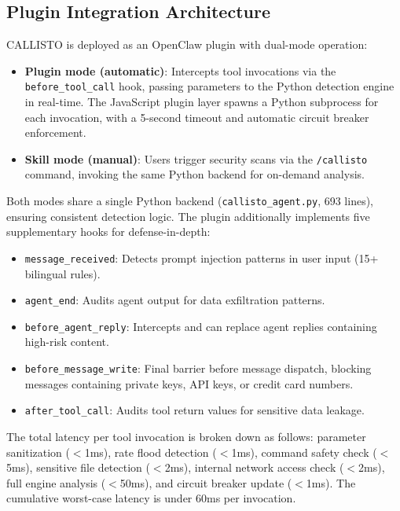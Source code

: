 \documentclass[10pt,conference]{IEEEtran}
\begin{document}
\subsection{Plugin Integration Architecture}

CALLISTO is deployed as an OpenClaw plugin with dual-mode operation:

\begin{itemize}
    \item \textbf{Plugin mode (automatic)}: Intercepts tool invocations via the \texttt{before\_tool\_call} hook, passing parameters to the Python detection engine in real-time. The JavaScript plugin layer spawns a Python subprocess for each invocation, with a 5-second timeout and automatic circuit breaker enforcement.
    \item \textbf{Skill mode (manual)}: Users trigger security scans via the \texttt{/callisto} command, invoking the same Python backend for on-demand analysis.
\end{itemize}

Both modes share a single Python backend (\texttt{callisto\_agent.py}, 693 lines), ensuring consistent detection logic. The plugin additionally implements five supplementary hooks for defense-in-depth:

\begin{itemize}
    \item \texttt{message\_received}: Detects prompt injection patterns in user input (15+ bilingual rules).
    \item \texttt{agent\_end}: Audits agent output for data exfiltration patterns.
    \item \texttt{before\_agent\_reply}: Intercepts and can replace agent replies containing high-risk content.
    \item \texttt{before\_message\_write}: Final barrier before message dispatch, blocking messages containing private keys, API keys, or credit card numbers.
    \item \texttt{after\_tool\_call}: Audits tool return values for sensitive data leakage.
\end{itemize}

The total latency per tool invocation is broken down as follows: parameter sanitization ($<$1ms), rate flood detection ($<$1ms), command safety check ($<$5ms), sensitive file detection ($<$2ms), internal network access check ($<$2ms), full engine analysis ($<$50ms), and circuit breaker update ($<$1ms). The cumulative worst-case latency is under 60ms per invocation.
\end{document}
